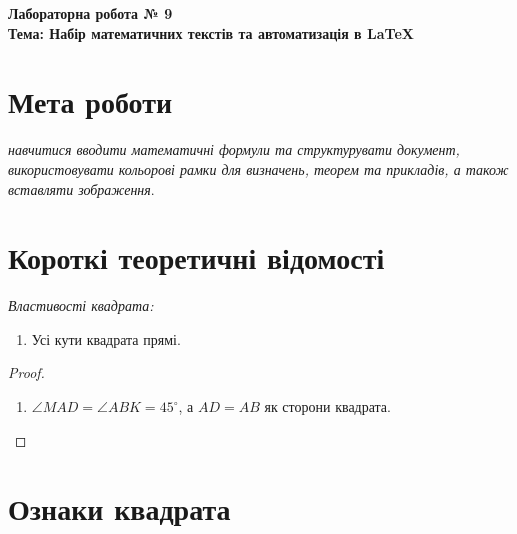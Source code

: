\documentclass[12pt]{article} %
\begin{document}
\begin{center}
    \Large \textbf{Лабораторна робота № 9} \\
    \large \textbf{Тема: Набір математичних текстів та автоматизація в LaTeX}
\end{center}

\section*{Мета роботи}
\textit{навчитися вводити математичні формули та структурувати документ, використовувати кольорові рамки для визначень, теорем та прикладів, а також вставляти зображення}.

\section{Короткі теоретичні відомості}

\begin{tcolorbox}[colback=blue!10!white, colframe=blue!80!black, title=Визначення]
\end{tcolorbox}



\medskip
\textit{Властивості квадрата:}
\begin{enumerate}
    \item Усі кути квадрата прямі.
\end{enumerate}


\begin{tcolorbox}[colback=green!5!white, colframe=green!75!black, title=Приклад 1]
\end{tcolorbox}


\begin{proof}
\begin{enumerate}
    \item $\angle MAD = \angle ABK = 45^\circ$, а $AD = AB$ як сторони квадрата.
\end{enumerate}
\end{proof}

\section{Ознаки квадрата}
\end{document}
